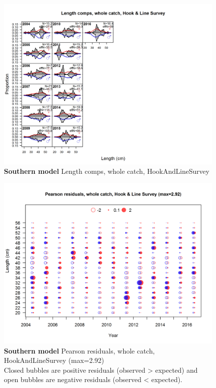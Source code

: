 \documentclass[12pt,]{article}
\begin{document}
\begin{figure}[htbp]
\centering
\includegraphics{./r4ss/plots_mod2/comp_lenfit_flt4mkt0.png}
\caption{\textbf{Southern model} Length comps, whole catch,
HookAndLineSurvey \label{fig:mod2_13_comp_lenfit_flt4mkt0}}
\end{figure}

\begin{figure}[htbp]
\centering
\includegraphics{./r4ss/plots_mod2/comp_lenfit_residsflt4mkt0.png}
\caption{\textbf{Southern model} Pearson residuals, whole catch,
HookAndLineSurvey (max=2.92)\\
Closed bubbles are positive residuals (observed \textgreater{} expected)
and open bubbles are negative residuals (observed \textless{} expected).
\label{fig:mod2_14_comp_lenfit_residsflt4mkt0}}
\end{figure}
\end{document}
